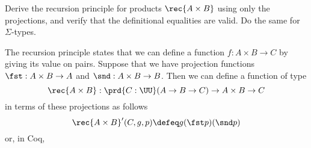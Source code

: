                        
              

 

\nwendcode{}%
  Derive the recursion principle for products $\rec{A
  \times B}$ using only the projections, and verify that the definitional
equalities are valid.  Do the same for $\Sigma$-types.

\soln The recursion principle states that we can define a function $f : A
\times B \to C$ by giving its value on pairs.  Suppose that we have projection
functions $\fst : A \times B \to A$ and $\snd : A \times B \to B$.  Then we can
define a function of type
\[
  \rec{A\times B} : \prd{C : \UU} (A \to B \to C) \to A \times B \to C
\]
in terms of these projections as follows
\[
  \rec{A \times B}'(C, g, p) \defeq 
  g(\fst p)(\snd p)
\]
or, in Coq,

\nwenddocs{}\plusendmoddef
{} 

    

                 
        

             
             

